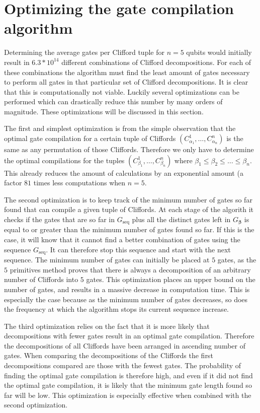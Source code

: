   \section{Optimizing the gate compilation algorithm}
    \label{Optimizing the gate compilation algorithm}
    Determining the average gates per Clifford tuple for $n=5$ qubits would initially result in $6.3*10^{14}$ different combinations of Clifford decompositions. For each of these combinations the algorithm must find the least amount of gates necessary to perform all gates in that particular set of Clifford decompositions. It is clear that this is computationally not viable. Luckily several optimizations can be performed which can drastically reduce this number by many orders of magnitude. These optimizations will be discussed in this section.

    The first and simplest optimization is from the simple observation that the optimal gate compilation for a certain tuple of Cliffords $\left(C_{\alpha_1}^1, \dots, C_{\alpha_n}^n\right)$ is the same as any permutation of those Cliffords. Therefore we only have to determine the optimal compilations for the tuples $\left(C_{\beta_1}^1, \dots, C_{\beta_n}^n\right)$ where $\beta_1 \leq \beta_2 \leq \dots \leq \beta_n$. This already reduces the amount of calculations by an exponential amount (a factor $81$ times less computations when $n=5$.

    The second optimization is to keep track of the minimum number of gates so far found that can compile a given tuple of Cliffords. At each stage of the algorith it checks if the gates that are so far in $G_\text{seq}$ plus all the distinct gates left in $G_{\bm{\beta}}$ is equal to or greater than the minimum number of gates found so far. If this is the case, it will know that it cannot find a better combination of gates using the sequence $G_\text{seq}$. It can therefore stop this sequence and start with the next sequence. The minimum number of gates can initially be placed at $5$ gates, as the $5$ primitives method proves that there is always a decomposition of an arbitrary number of Cliffords into $5$ gates. This optimization places an upper bound on the number of gates, and results in a massive decrease in computation time. This is especially the case because as the minimum number of gates decreases, so does the frequency at which the algorithm stops its current sequence increase.

    The third optimization relies on the fact that it is more likely that decompositions with fewer gates result in an optimal gate compilation. Therefore the decompositions of all Cliffords have been arranged in ascending number of gates. When comparing the decompositions of the Cliffords the first decompositions compared are those with the fewest gates. The probability of finding the optimal gate compilation is therefore high, and even if it did not find the optimal gate compilation, it is likely that the minimum gate length found so far will be low. This optimization is especially effective when combined with the second optimization.

